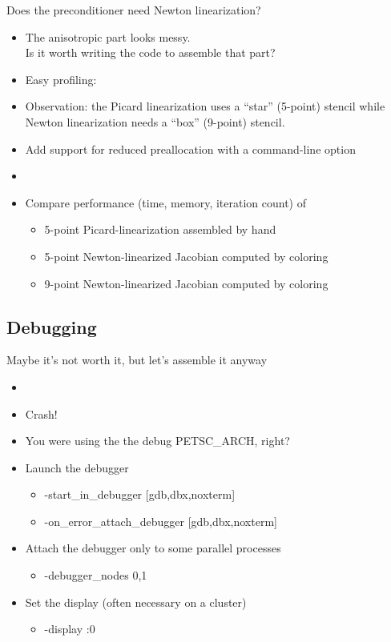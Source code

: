 \begin{frame}{Does the preconditioner need Newton linearization?}
  \begin{itemize}
  \item The anisotropic part looks messy.  \\
    \alert{Is it worth writing the code to assemble that part?}
  \item Easy profiling: 
  \item Observation: the Picard linearization uses a ``star'' (5-point)
    stencil while Newton linearization needs a ``box'' (9-point) stencil.
  \item Add support for reduced preallocation with a command-line option
  \item {}
  \item Compare performance (time, memory, iteration count) of
    \begin{itemize}
    \item 5-point Picard-linearization assembled by hand
    \item 5-point Newton-linearized Jacobian computed by coloring
    \item 9-point Newton-linearized Jacobian computed by coloring
    \end{itemize}
  \end{itemize}
\end{frame}

\subsection{Debugging}
\begin{frame}{Maybe it's not worth it, but let's assemble it anyway}
  \begin{itemize}
  \item {}
  \item Crash!
  \item You were using the the debug PETSC\_ARCH, right?
  \item Launch the debugger
  \begin{itemize}
    \item {\kb -start\_in\_debugger  [gdb,dbx,noxterm]}
    \item {\kb -on\_error\_attach\_debugger [gdb,dbx,noxterm]}
  \end{itemize}

  \item Attach the debugger only to some parallel processes
  \begin{itemize}
    \item {\kb -debugger\_nodes 0,1}
  \end{itemize}

  \item Set the display (often necessary on a cluster)
  \begin{itemize}
    \item {\kb -display :0}
  \end{itemize}
\end{itemize}
\end{frame}  

